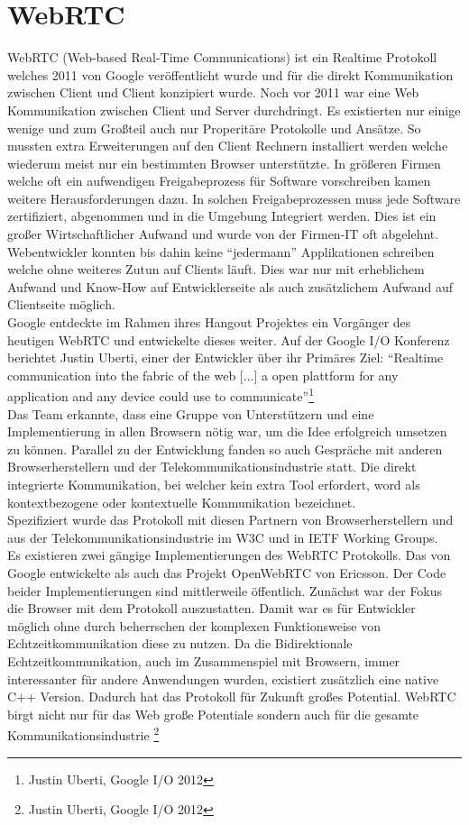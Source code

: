 \chapter{WebRTC}
\label{sec:RTC DataChannel}
WebRTC (Web-based Real-Time Communications) ist ein Realtime Protokoll welches 2011 von Google veröffentlicht wurde und für die direkt Kommunikation zwischen Client und  Client konzipiert wurde. Noch vor 2011 war eine Web Kommunikation zwischen Client und Server durchdringt. Es existierten nur einige wenige und zum Großteil auch nur Properitäre Protokolle und Ansätze. So mussten extra Erweiterungen auf den Client Rechnern installiert werden welche wiederum meist nur ein bestimmten Browser unterstützte. In größeren Firmen welche oft ein aufwendigen Freigabeprozess für Software vorschreiben kamen weitere Herausforderungen dazu. In solchen Freigabeprozessen muss jede Software zertifiziert, abgenommen und in die Umgebung Integriert werden. Dies ist ein großer Wirtschaftlicher Aufwand und wurde von der Firmen-IT oft abgelehnt. 
\\Webentwickler konnten bis dahin keine "`jedermann"' Applikationen schreiben welche ohne weiteres Zutun auf Clients läuft. Dies war nur mit erheblichem Aufwand und Know-How auf Entwicklerseite als auch zusätzlichem Aufwand auf Clientseite möglich.
\\Google entdeckte im Rahmen ihres Hangout Projektes ein Vorgänger des heutigen WebRTC und entwickelte dieses weiter. Auf der Google I/O Konferenz berichtet Justin Uberti, einer der Entwickler über ihr Primäres Ziel: "`Realtime communication into the fabric of the web [...] a open plattform for any application and any device could use to communicate"'\footnote{Justin Uberti, Google I/O 2012}\\
Das Team erkannte, dass eine Gruppe von Unterstützern und eine Implementierung in allen Browsern nötig war, um die Idee erfolgreich umsetzen zu können. Parallel zu der Entwicklung fanden so auch Gespräche mit anderen Browserherstellern und der Telekommunikationsindustrie statt. Die direkt integrierte Kommunikation, bei welcher kein extra Tool erfordert, word als kontextbezogene oder kontextuelle Kommunikation bezeichnet. \cite{WebRTC Standard für die Web basierte Echtzeitkommunikation}
\\Spezifiziert wurde das Protokoll mit diesen Partnern von Browserherstellern und aus der Telekommunikationsindustrie im W3C und in IETF Working Groups.
\bigskip\\Es existieren zwei gängige Implementierungen des WebRTC Protokolls. Das von Google entwickelte als auch das Projekt OpenWebRTC von Ericsson. Der Code beider Implementierungen sind mittlerweile öffentlich. Zunächst war der Fokus die Browser mit dem Protokoll auszustatten. Damit war es für Entwickler möglich ohne durch beherrschen der komplexen Funktionsweise von Echtzeitkommunikation diese zu nutzen. Da die Bidirektionale Echtzeitkommunikation, auch im Zusammenspiel mit Browsern, immer interessanter für andere Anwendungen wurden, existiert zusätzlich eine native C++ Version. Dadurch hat das Protokoll für Zukunft großes Potential. WebRTC  birgt nicht nur für das Web große Potentiale sondern auch für die gesamte Kommunikationsindustrie \footnote{Justin Uberti, Google I/O 2012}

